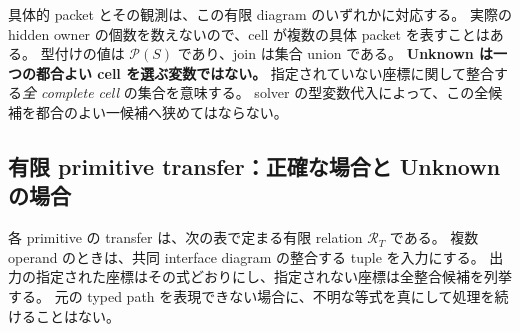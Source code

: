 \documentclass[11pt,a4paper]{article}
\theoremstyle{remark}
\begin{document}
具体的 packet とその観測は、この有限 diagram のいずれかに対応する。
実際の hidden owner の個数を数えないので、cell が複数の具体 packet を表すことはある。
型付けの値は $\mathcal P(S)$ であり、join は集合 union である。
\textbf{Unknown は一つの都合よい cell を選ぶ変数ではない。}
指定されていない座標に関して整合する\emph{全 complete cell} の集合を意味する。
solver の型変数代入によって、この全候補を都合のよい一候補へ狭めてはならない。

\subsection{有限 primitive transfer：正確な場合と Unknown の場合}

各 primitive の transfer は、次の表で定まる有限 relation $\mathcal R_T$ である。
複数 operand のときは、共同 interface diagram の整合する tuple を入力にする。
出力の指定された座標はその式どおりにし、指定されない座標は全整合候補を列挙する。
元の typed path を表現できない場合に、不明な等式を真にして処理を続けることはない。
\end{document}
